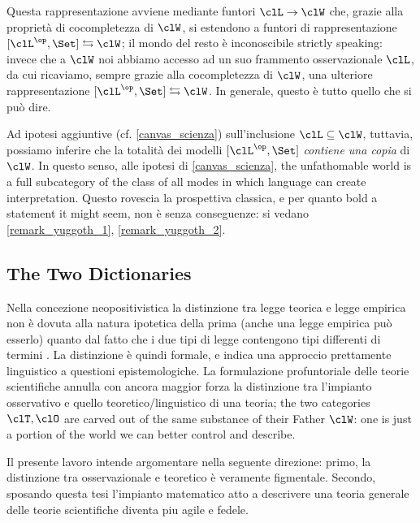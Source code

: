 Questa rappresentazione avviene mediante funtori $\clL \to \clW$ che, grazie alla proprietà di cocompletezza di $\clW$, si estendono a funtori di rappresentazione $[\clL^\op,\Set] \leftrightarrows \clW$; il mondo del resto è inconoscibile strictly speaking: invece che a $\clW$ noi abbiamo accesso ad un suo frammento osservazionale $\clL$, da cui ricaviamo, sempre grazie alla cocompletezza di $\clW$, una ulteriore rappresentazione $[\clL^\op,\Set] \leftrightarrows \clW$. In generale, questo è tutto quello che si può dire. 

Ad ipotesi aggiuntive (cf. \autoref{canvas_scienza}) sull'inclusione $\clL\subseteq \clW$, tuttavia, possiamo inferire che la totalità dei modelli $[\clL^\op,\Set]$ \emph{contiene una copia} di $\clW$. In questo senso, alle ipotesi di \autoref{canvas_scienza}, the unfathomable world is a full subcategory of the class of all modes in which language can create interpretation. Questo rovescia la prospettiva classica, e per quanto bold a statement it might seem, non è senza conseguenze: si vedano \autoref{remark_yuggoth_1}, \autoref{remark_yuggoth_2}.

\subsection{The Two Dictionaries}
Nella concezione neopositivistica la distinzione tra legge teorica e legge empirica non è dovuta alla natura ipotetica della prima (anche una legge empirica può esserlo) quanto dal fatto che i due tipi di legge contengono tipi differenti di termini \cite{?}. La distinzione è quindi formale, e indica una approccio prettamente linguistico a questioni epistemologiche. La formulazione profuntoriale delle teorie scientifiche annulla con ancora maggior forza la distinzione tra l'impianto osservativo e quello teoretico/linguistico di una teoria; the two categories $\clT, \clO$ are carved out of the same substance of their Father $\clW$: one is just a portion of the world we can better control and describe.

Il presente lavoro intende argomentare nella seguente direzione: primo, la distinzione tra osservazionale e teoretico è veramente figmentale. Secondo, sposando questa tesi l'impianto matematico atto a descrivere una teoria generale delle teorie scientifiche diventa piu agile e fedele.

